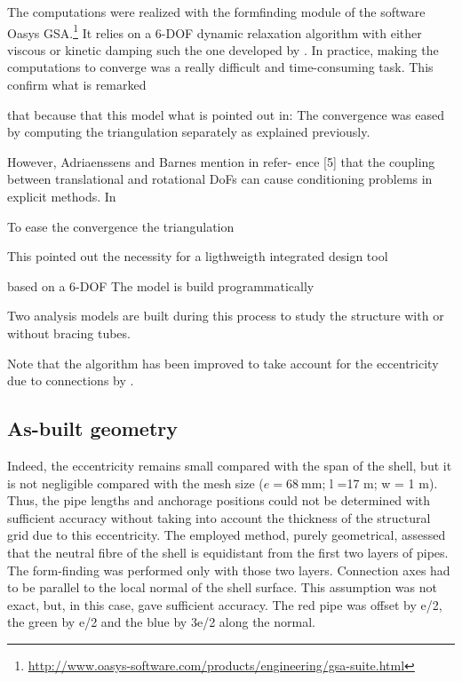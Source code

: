 The computations were realized with the formfinding module of the software Oasys GSA.\footnote{\url{http://www.oasys-software.com/products/engineering/gsa-suite.html}} It relies on a 6-DOF dynamic relaxation algorithm with either viscous or kinetic damping such the one developed by \cite{Adriaenssens2000}. In practice, making the computations to converge was a really difficult and time-consuming task. This confirm what is remarked 

\citeauthor{Barnes1975}

that because that this model what is pointed out in: The convergence was eased by computing the triangulation separately as explained previously.

However, Adriaenssens and Barnes mention in refer- ence [5] that the coupling between translational and rotational DoFs can cause conditioning problems in explicit methods. In

To ease the convergence the triangulation 

This pointed out the necessity for a ligthweigth integrated design tool

based on a 6-DOF The model is build programmatically 

Two analysis models are built during this process to study the structure with or without bracing tubes.


Note that the algorithm has been improved to take account for the eccentricity due to connections by \cite{Douthe2006}.

\subsection{As-built geometry}\label{sec:asbuilt}
Indeed, the eccentricity remains small compared with the span of the shell, but it is not negligible compared with the mesh size ($e = \SI{68}{\mm} $; l =17 m; w = 1 m). Thus, the pipe lengths and anchorage positions could not be determined with sufficient accuracy without taking into account the thickness of the structural grid due to this eccentricity. The employed method, purely geometrical, assessed that the neutral fibre of the shell is equidistant from the first two layers of pipes. The form-finding was performed only with those two layers. Connection axes had to be parallel to the local normal of the shell surface. This assumption was not exact, but, in this case, gave sufficient accuracy. The red pipe was offset by e/2, the green by e/2 and the blue by 3e/2 along the normal.

